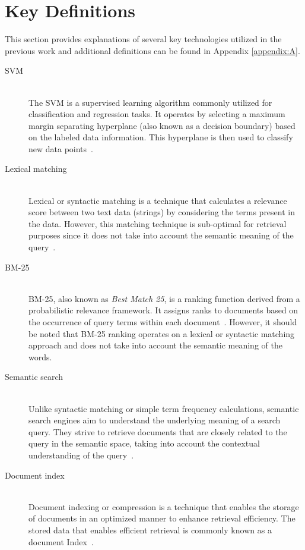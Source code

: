 \section{Key Definitions}

This section provides explanations of several key technologies utilized in the previous work and additional definitions can be found in Appendix \ref{appendix:A}.

\begin{description}
	
	\item[\ac{SVM}] \hfill \\ The \ac{SVM} is a supervised learning algorithm commonly utilized for classification and regression tasks. It operates by selecting a maximum margin separating hyperplane (also known as a decision boundary) based on the labeled data information. This hyperplane is then used to classify new data points~\cite{noble2006support}.
	
	\item[Lexical matching] \hfill \\ Lexical or syntactic matching is a technique that calculates a relevance score between two text data (strings) by considering the terms present in the data. However, this matching technique is sub-optimal for retrieval purposes since it does not take into account the semantic meaning of the query~\cite{kuzi2020leveraging}.
	
	\item[BM-25] \hfill \\ BM-25, also known as \emph{Best Match 25}, is a ranking function derived from a probabilistic relevance framework. It assigns ranks to documents based on the occurrence of query terms within each document~\cite{amati_bm25_2009}. However, it should be noted that BM-25 ranking operates on a lexical or syntactic matching approach and does not take into account the semantic meaning of the words.
	
	\item[Semantic search] \hfill \\ Unlike syntactic matching or simple term frequency calculations, semantic search engines aim to understand the underlying meaning of a search query. They strive to retrieve documents that are closely related to the query in the semantic space, taking into account the contextual understanding of the query~\cite{dong2008survey}.
	
	\item[Document index] \hfill \\ Document indexing or compression is a technique that enables the storage of documents in an optimized manner to enhance retrieval efficiency. The stored data that enables efficient retrieval is commonly known as a document Index~\cite{ziviani2000compression}.
	

\end{description}
